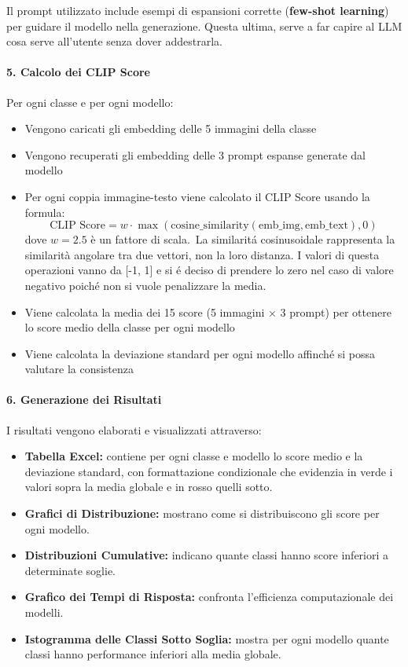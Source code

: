 \documentclass{article}
\begin{document}
Il prompt utilizzato include esempi di espansioni corrette (\textbf{few-shot learning}) per guidare il modello nella generazione. Questa ultima, serve a far capire al LLM cosa serve all'utente senza dover addestrarla.

\paragraph{5. Calcolo dei CLIP Score}
Per ogni classe e per ogni modello:
\begin{itemize}
    \item Vengono caricati gli embedding delle 5 immagini della classe
    \item Vengono recuperati gli embedding delle 3 prompt espanse generate dal modello
    \item Per ogni coppia immagine-testo viene calcolato il CLIP Score usando la formula:
    \[ \text{CLIP Score} = w \cdot \max(\text{cosine\_similarity}(\text{emb\_img}, \text{emb\_text}), 0) \]
    dove $w = 2.5$ è un fattore di scala.\
    La similaritá cosinusoidale rappresenta la similarità angolare tra due vettori, non la loro distanza. I valori di questa operazioni vanno da [-1, 1] e si é deciso di prendere lo zero nel caso di valore negativo poiché non si vuole penalizzare la media.
    \item Viene calcolata la media dei 15 score (5 immagini × 3 prompt) per ottenere lo score medio della classe per ogni modello
    \item Viene calcolata la deviazione standard per ogni modello affinché si possa valutare la consistenza
\end{itemize}

\paragraph{6. Generazione dei Risultati}
I risultati vengono elaborati e visualizzati attraverso:
\begin{itemize}
    \item \textbf{Tabella Excel:} contiene per ogni classe e modello lo score medio e la deviazione standard, con formattazione condizionale che evidenzia in verde i valori sopra la media globale e in rosso quelli sotto.
    \item \textbf{Grafici di Distribuzione:} mostrano come si distribuiscono gli score per ogni modello.
    \item \textbf{Distribuzioni Cumulative:} indicano quante classi hanno score inferiori a determinate soglie.
    \item \textbf{Grafico dei Tempi di Risposta:} confronta l'efficienza computazionale dei modelli.
    \item \textbf{Istogramma delle Classi Sotto Soglia:} mostra per ogni modello quante classi hanno performance inferiori alla media globale.
\end{itemize}
\newpage
\end{document}
